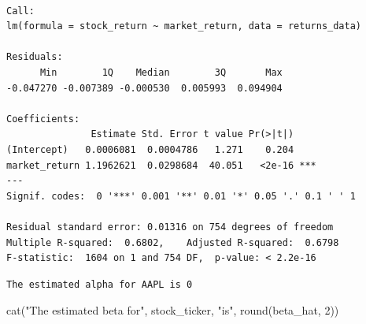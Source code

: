 \documentclass[
]{scrartcl}
\newenvironment{Shaded}{\begin{snugshade}}{\end{snugshade}}
\newcommand{\AttributeTok}[1]{\textcolor[rgb]{0.40,0.45,0.13}{#1}}
\newcommand{\CommentTok}[1]{\textcolor[rgb]{0.37,0.37,0.37}{#1}}
\newcommand{\DecValTok}[1]{\textcolor[rgb]{0.68,0.00,0.00}{#1}}
\newcommand{\FunctionTok}[1]{\textcolor[rgb]{0.28,0.35,0.67}{#1}}
\newcommand{\NormalTok}[1]{\textcolor[rgb]{0.00,0.23,0.31}{#1}}
\newcommand{\OtherTok}[1]{\textcolor[rgb]{0.00,0.23,0.31}{#1}}
\newcommand{\SpecialCharTok}[1]{\textcolor[rgb]{0.37,0.37,0.37}{#1}}
\newcommand{\StringTok}[1]{\textcolor[rgb]{0.13,0.47,0.30}{#1}}
\begin{document}
\begin{verbatim}

Call:
lm(formula = stock_return ~ market_return, data = returns_data)

Residuals:
      Min        1Q    Median        3Q       Max 
-0.047270 -0.007389 -0.000530  0.005993  0.094904 

Coefficients:
               Estimate Std. Error t value Pr(>|t|)    
(Intercept)   0.0006081  0.0004786   1.271    0.204    
market_return 1.1962621  0.0298684  40.051   <2e-16 ***
---
Signif. codes:  0 '***' 0.001 '**' 0.01 '*' 0.05 '.' 0.1 ' ' 1

Residual standard error: 0.01316 on 754 degrees of freedom
Multiple R-squared:  0.6802,    Adjusted R-squared:  0.6798 
F-statistic:  1604 on 1 and 754 DF,  p-value: < 2.2e-16
\end{verbatim}

\begin{Shaded}
\end{Shaded}

\begin{verbatim}
The estimated alpha for AAPL is 0 
\end{verbatim}

\begin{Shaded}
\begin{Highlighting}[]
\FunctionTok{cat}\NormalTok{(}\StringTok{"The estimated beta for"}\NormalTok{, stock\_ticker, }\StringTok{"is"}\NormalTok{, }\FunctionTok{round}\NormalTok{(beta\_hat, }\DecValTok{2}\NormalTok{))}
\end{Highlighting}
\end{Shaded}
\end{document}
